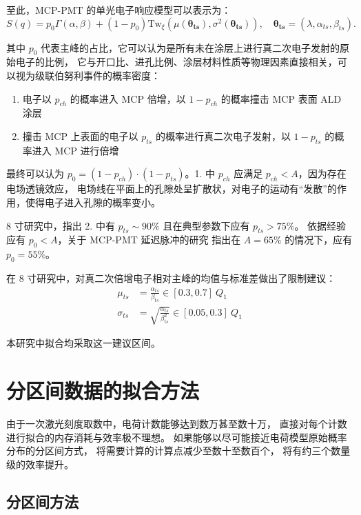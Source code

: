 至此，MCP-PMT 的单光电子响应模型可以表示为：
\begin{equation}
    S(q)=p_0\Gamma(\alpha, \beta)+(1-p_0)\mathrm{Tw}_{\xi}
    \left(\mu(\boldsymbol{\theta_{ts}}),\sigma^2(\boldsymbol{\theta_{ts}})\right),\quad
    \boldsymbol{\theta_{ts}}=(\lambda, \alpha_{ts},\beta_{ts}).
\end{equation}

其中 $p_0$ 代表主峰的占比，它可以认为是所有未在涂层上进行真二次电子发射的原始电子的比例，
它与开口比、进孔比例、涂层材料性质等物理因素直接相关，可以视为级联伯努利事件的概率密度：
\begin{enumerate}
    \item 电子以 $p_{ch}$ 的概率进入 MCP 倍增，以 $1-p_{ch}$ 的概率撞击 MCP 表面 ALD 涂层
    \item 撞击 MCP 上表面的电子以 $p_{ts}$ 的概率进行真二次电子发射，以 $1-p_{ts}$ 的概率进入 MCP 进行倍增
\end{enumerate}

最终可以认为 $p_0=(1-p_{ch})\cdot(1-p_{ts})$。1. 中 $p_{ch}$ 应满足 $p_{ch}<A$，因为存在电场透镜效应，
电场线在平面上的孔隙处呈扩散状，对电子的运动有“发散”的作用，使得电子进入孔隙的概率变小。

8 寸研究中，指出 2. 中有 $p_{ts}\sim90\%$ 且在典型参数下应有 $p_{ts}>75\%$。
依据经验应有 $p_0<A$，关于 MCP-PMT 延迟脉冲的研究\cite{chenPhotoelectronBackscatteringMicrochannel2018}
指出在 $A=65\%$ 的情况下，应有 $p_0=55\%$。

在 8 寸研究中，对真二次倍增电子相对主峰的均值与标准差做出了限制建议：
\begin{align}
    \mu_{ts}&=\frac{\alpha_{ts}}{\beta_{ts}}\in[0.3, 0.7]\ Q_1\\
    \sigma_{ts}&=\sqrt{\frac{\alpha_{ts}}{\beta_{ts}^2}}\in[0.05, 0.3]\ Q_1
\end{align}

本研究中拟合均采取这一建议区间。

\section{分区间数据的拟合方法}

由于一次激光刻度取数中，电荷计数能够达到数万甚至数十万，
直接对每个计数进行拟合的内存消耗与效率极不理想。
如果能够以尽可能接近电荷模型原始概率分布的分区间方式，
将需要计算的计算点减少至数十至数百个，
将有约三个数量级的效率提升。

\subsection{分区间方法}

